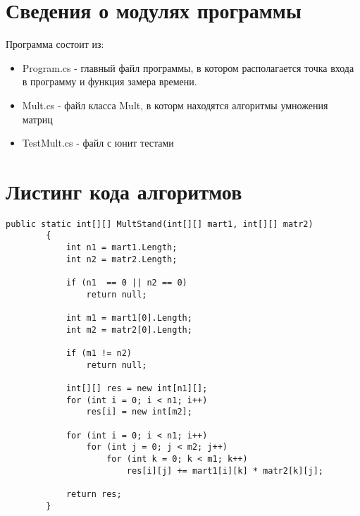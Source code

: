 \documentclass[12pt]{report}
\begin{document}
\section{Сведения о модулях программы}
Программа состоит из:
\begin{itemize}
	\item Program.cs - главный файл программы, в котором располагается точка входа в программу и функция замера времени.
	\item Mult.cs - файл класса Mult, в которм находятся алгоритмы умножения матриц
	\item TestMult.cs - файл с юнит тестами
\end{itemize}


\section{Листинг кода алгоритмов}

\begin{lstlisting}[label=CodeStand,caption= Стандартный алгоритм умножения матриц]
public static int[][] MultStand(int[][] mart1, int[][] matr2)
        {
            int n1 = mart1.Length;
            int n2 = matr2.Length;

            if (n1  == 0 || n2 == 0)
                return null;

            int m1 = mart1[0].Length;
            int m2 = matr2[0].Length;

            if (m1 != n2)
                return null;

            int[][] res = new int[n1][];
            for (int i = 0; i < n1; i++)
                res[i] = new int[m2];

            for (int i = 0; i < n1; i++)
                for (int j = 0; j < m2; j++)
                    for (int k = 0; k < m1; k++)
                        res[i][j] += mart1[i][k] * matr2[k][j];

            return res;
        }
\end{lstlisting}
\end{document}
